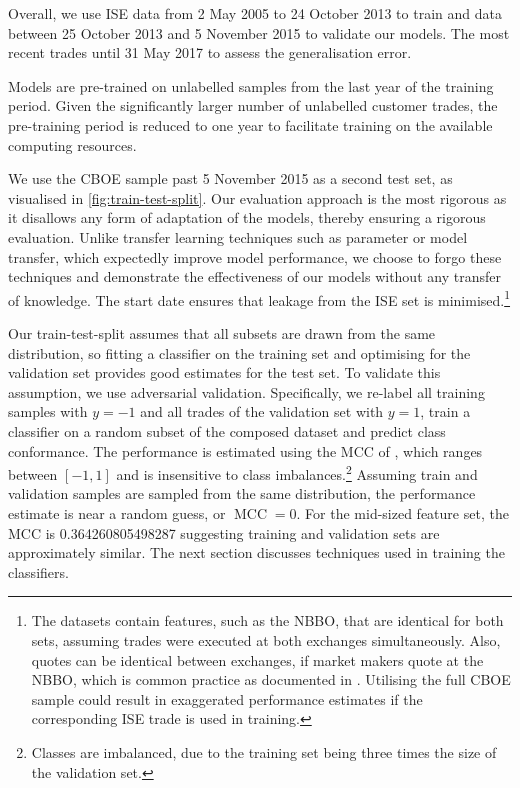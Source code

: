 Overall, we use \gls{ISE} data from 2 May 2005 to 24 October 2013 to train and data between 25 October 2013 and 5 November 2015 to validate our models. The most recent trades until 31 May 2017 to assess the generalisation error.

Models are pre-trained on unlabelled samples from the last year of the training period. Given the significantly larger number of unlabelled customer trades, the pre-training period is reduced to one year to facilitate training on the available computing resources.

We use the \gls{CBOE} sample past 5 November 2015 as a second test set, as visualised in \cref{fig:train-test-split}. Our evaluation approach is the most rigorous as it disallows any form of adaptation of the models, thereby ensuring a rigorous evaluation. Unlike transfer learning techniques such as parameter or model transfer, which expectedly improve model performance, we choose to forgo these techniques and demonstrate the effectiveness of our models without any transfer of knowledge. The start date ensures that leakage from the \gls{ISE} set is minimised.\footnote{The datasets contain features, such as the \gls{NBBO}, that are identical for both sets, assuming trades were executed at both exchanges simultaneously. Also, quotes can be identical between exchanges, if market makers quote at the \gls{NBBO}, which is common practice as documented in \textcite[10]{securitiesandexchangecommissionReportConcerningExaminations2007}. Utilising the full \gls{CBOE} sample could result in exaggerated performance estimates if the corresponding \gls{ISE} trade is used in training.}

Our train-test-split assumes that all subsets are drawn from the same distribution, so fitting a classifier on the training set and optimising for the validation set provides good estimates for the test set. To validate this assumption, we use adversarial validation. Specifically, we re-label all training samples with $y=-1$ and all trades of the validation set with $y=1$, train a classifier on a random subset of the composed dataset and predict class conformance. The performance is estimated using the \gls{MCC} of \textcite[][445]{matthewsComparisonPredictedObserved1975}, which ranges between $\left[-1, 1\right]$ and is insensitive to class imbalances.\footnote{Classes are imbalanced, due to the training set being three times the size of the validation set.} Assuming train and validation samples are sampled from the same distribution, the performance estimate is near a random guess, or $\operatorname{MCC} = 0$. For the mid-sized feature set, the \gls{MCC} is \num{0.364260805498287} suggesting training and validation sets are approximately similar. The next section discusses techniques used in training the classifiers.